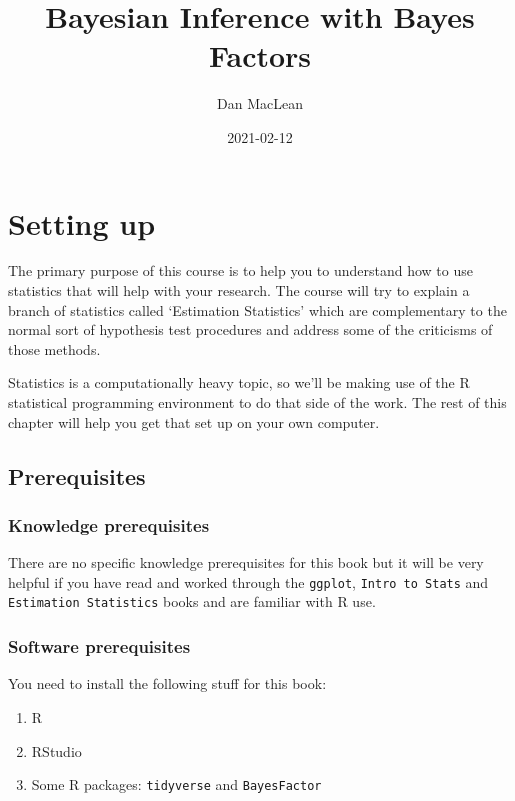 \documentclass[
]{book}
\title{Bayesian Inference with Bayes Factors}
\author{Dan MacLean}
\date{2021-02-12}
\providecommand{\tightlist}{%
  \setlength{\itemsep}{0pt}\setlength{\parskip}{0pt}}
\begin{document}
\maketitle

{
\setcounter{tocdepth}{1}
\tableofcontents
}
\hypertarget{setting-up}{%
\chapter{Setting up}\label{setting-up}}

The primary purpose of this course is to help you to understand how to use statistics that will help with your research. The course will try to explain a branch of statistics called `Estimation Statistics' which are complementary to the normal sort of hypothesis test procedures and address some of the criticisms of those methods.

Statistics is a computationally heavy topic, so we'll be making use of the R statistical programming environment to do that side of the work. The rest of this chapter will help you get that set up on your own computer.

\hypertarget{prerequisites}{%
\section{Prerequisites}\label{prerequisites}}

\hypertarget{knowledge-prerequisites}{%
\subsection{Knowledge prerequisites}\label{knowledge-prerequisites}}

There are no specific knowledge prerequisites for this book but it will be very helpful if you have read and worked through the \texttt{ggplot}, \texttt{Intro\ to\ Stats} and \texttt{Estimation\ Statistics} books and are familiar with R use.

\hypertarget{software-prerequisites}{%
\subsection{Software prerequisites}\label{software-prerequisites}}

You need to install the following stuff for this book:

\begin{enumerate}
\def\labelenumi{\arabic{enumi}.}
\tightlist
\item
  R
\item
  RStudio
\item
  Some R packages: \texttt{tidyverse} and \texttt{BayesFactor}
\end{enumerate}
\end{document}

